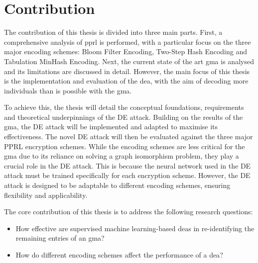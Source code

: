 





\section{Contribution}  \label{sec:contribution}

The contribution of this thesis is divided into three main parts.
First, a comprehensive analysis of \ac{pprl} is performed, with a particular focus on the three major encoding schemes: Bloom Filter Encoding, Two-Step Hash Encoding and Tabulation MinHash Encoding.
Next, the current state of the art \ac{gma} is analysed and its limitations are discussed in detail.
However, the main focus of this thesis is the implementation and evaluation of the \ac{dea}, with the aim of decoding more individuals than is possible with the \ac{gma}.

To achieve this, the thesis will detail the conceptual foundations, requirements and theoretical underpinnings of the DE attack.
Building on the results of the \ac{gma}, the DE attack will be implemented and adapted to maximise its effectiveness.
The novel DE attack will then be evaluated against the three major PPRL encryption schemes.
While the encoding schemes are less critical for the \ac{gma} due to its reliance on solving a graph isomorphism problem, they play a crucial role in the DE attack.
This is because the neural network used in the DE attack must be trained specifically for each encryption scheme.
However, the DE attack is designed to be adaptable to different encoding schemes, ensuring flexibility and applicability.

The core contribution of this thesis is to address the following research questions:

\begin{itemize}
    \item How effective are supervised machine learning-based \ac{dea}s in re-identifying the remaining entries of an \ac{gma}?
    \item How do different encoding schemes affect the performance of a \ac{dea}?
\end{itemize}



